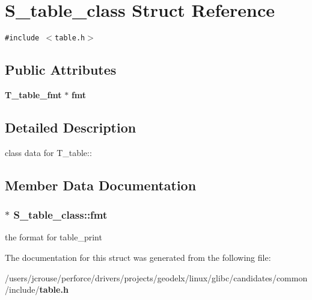 \section{S\_\-table\_\-class Struct Reference}
\label{structS__table__class}
{\tt \#include $<$table.h$>$}

\subsection*{Public Attributes}
\begin{CompactItemize}
\item 
{\bf T\_\-table\_\-fmt} $\ast$ {\bf fmt}
\end{CompactItemize}


\subsection{Detailed Description}
class data for T\_\-table:: 



\subsection{Member Data Documentation}
\subsubsection{$\ast$ S\_\-table\_\-class::fmt}\label{structS__table__class_m0}


the format for table\_\-print 

The documentation for this struct was generated from the following file:\begin{CompactItemize}
\item 
/users/jcrouse/perforce/drivers/projects/geodelx/linux/glibc/candidates/common/include/{\bf table.h}\end{CompactItemize}
